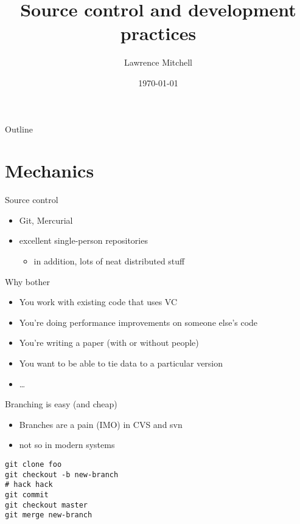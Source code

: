 \documentclass[presentation]{beamer}
\author{Lawrence Mitchell}
\date{\today}
\title{Source control and development practices}
\begin{document}
\maketitle
\begin{frame}{Outline}
\tableofcontents
\end{frame}


\section{Mechanics}
\label{sec-1}

\begin{frame}[label=sec-1-1]{Source control}
\begin{itemize}
\item Git, Mercurial
\item excellent single-person repositories
\begin{itemize}
\item in addition, lots of neat distributed stuff
\end{itemize}
\end{itemize}
\end{frame}
\begin{frame}[label=sec-1-2]{Why bother}
\begin{itemize}
\item You work with existing code that uses VC
\item You're doing performance improvements on someone else's code
\item You're writing a paper (with or without people)
\item You want to be able to tie data to a particular version
\item \ldots{}
\end{itemize}
\end{frame}
\begin{frame}[fragile,label=sec-1-3]{Branching is easy (and cheap)}
 \begin{itemize}
\item Branches are a pain (IMO) in CVS and svn
\item not so in modern systems
\end{itemize}
\begin{verbatim}
git clone foo
git checkout -b new-branch
# hack hack
git commit
git checkout master
git merge new-branch
\end{verbatim}
\end{frame}
\end{document}
